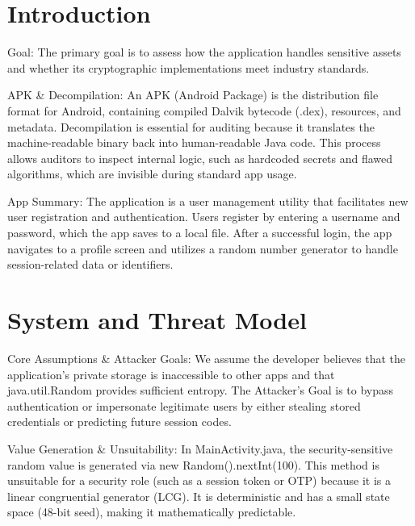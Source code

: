 \section{Introduction}

Goal: The primary goal is to assess how the application handles sensitive assets and whether its cryptographic implementations meet industry standards.

APK \& Decompilation: An APK (Android Package) is the distribution file format for Android, containing compiled Dalvik bytecode (.dex), resources, and metadata. Decompilation is essential for auditing because it translates the machine-readable binary back into human-readable Java code. This process allows auditors to inspect internal logic, such as hardcoded secrets and flawed algorithms, which are invisible during standard app usage.

App Summary: The application is a user management utility that facilitates new user registration and authentication. Users register by entering a username and password, which the app saves to a local file. After a successful login, the app navigates to a profile screen and utilizes a random number generator to handle session-related data or identifiers.

\section{System and Threat Model}


Core Assumptions \& Attacker Goals:
We assume the developer believes that the application’s private storage is inaccessible to other apps and that java.util.Random provides sufficient entropy. The Attacker’s Goal is to bypass authentication or impersonate legitimate users by either stealing stored credentials or predicting future session codes.

Value Generation \& Unsuitability:
In MainActivity.java, the security-sensitive random value is generated via new Random().nextInt(100). This method is unsuitable for a security role (such as a session token or OTP) because it is a linear congruential generator (LCG). It is deterministic and has a small state space (48-bit seed), making it mathematically predictable.

